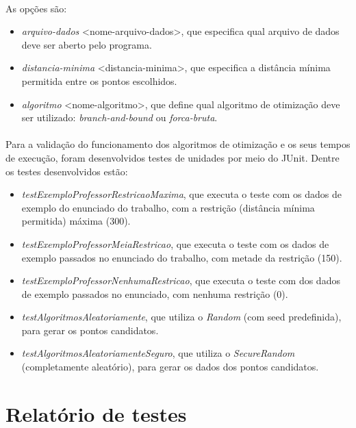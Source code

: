 \documentclass[12pt]{article}
\begin{document}
\paragraph{}As opções são:

\begin{itemize}
    \item \textit{\-\-arquivo-dados} <nome-arquivo-dados>, que especifica qual arquivo de dados deve ser aberto pelo programa.
    \item \textit{\-\-distancia-minima} <distancia-minima>, que especifica a distância mínima permitida entre os pontos escolhidos.
    \item \textit{\-\-algoritmo} <nome-algoritmo>, que define qual algoritmo de otimização deve ser utilizado: \textit{branch-and-bound} ou \textit{forca-bruta}.
\end{itemize}

\paragraph{}Para a validação do funcionamento dos algoritmos de otimização e os seus tempos de execução, foram desenvolvidos testes de unidades por meio do JUnit. Dentre os testes desenvolvidos estão:

\begin{itemize}
    \item \textit{testExemploProfessorRestricaoMaxima}, que executa o teste com os dados de exemplo do enunciado do trabalho, com a restrição (distância mínima permitida) máxima (300).
    \item \textit{testExemploProfessorMeiaRestricao}, que executa o teste com os dados de exemplo passados no enunciado do trabalho, com metade da restrição (150).
    \item \textit{testExemploProfessorNenhumaRestricao}, que executa o teste com dos dados de exemplo passados no enunciado, com nenhuma restrição (0).
    \item \textit{testAlgoritmosAleatoriamente}, que utiliza o \textit{Random} (com seed predefinida), para gerar os pontos candidatos.
    \item \textit{testAlgoritmosAleatoriamenteSeguro}, que utiliza o \textit{SecureRandom} (completamente aleatório), para gerar os dados dos pontos candidatos.
\end{itemize}

\section{Relatório de testes}
\end{document}
